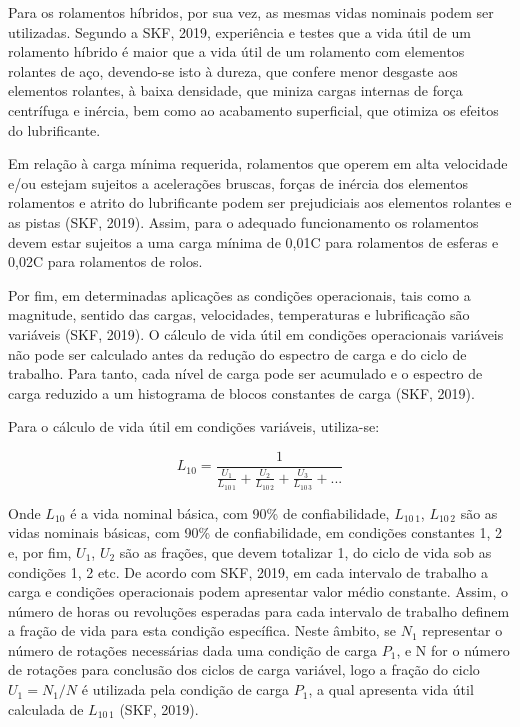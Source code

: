 \documentclass[
	12pt,				
	oneside,			
	a4paper,			
	english,			
	brazil,			
	]{abntex2ppgsi}
\begin{document}
Para os rolamentos híbridos, por sua vez, as mesmas vidas nominais podem ser utilizadas. Segundo a SKF, 2019, experiência e testes que a vida útil de um rolamento híbrido é maior que a vida útil de um rolamento com elementos rolantes de aço, devendo-se isto à dureza, que confere menor desgaste aos elementos rolantes, à baixa densidade, que miniza cargas internas de força centrífuga e inércia, bem como ao acabamento superficial, que otimiza os efeitos do lubrificante.

Em relação à carga mínima requerida, rolamentos que operem em alta velocidade e/ou estejam sujeitos a acelerações bruscas, forças de inércia dos elementos rolamentos e atrito do lubrificante podem ser prejudiciais aos elementos rolantes e as pistas (SKF, 2019). Assim, para o adequado funcionamento os rolamentos devem estar sujeitos a uma carga mínima de 0,01C para rolamentos de esferas e 0,02C para rolamentos de rolos. 

Por fim, em determinadas aplicações as condições operacionais, tais como a magnitude, sentido das cargas, velocidades, temperaturas e lubrificação são variáveis (SKF, 2019). O cálculo de vida útil em condições operacionais variáveis não pode ser calculado antes da redução do espectro de carga e do ciclo de trabalho. Para tanto, cada nível de carga pode ser acumulado e o espectro de carga reduzido a um histograma de blocos constantes de carga (SKF, 2019).

Para o cálculo de vida útil em condições variáveis, utiliza-se:

\begin{equation}
	L_{10}= \frac{1}{ \frac{U_{1}}{L_{10 \,1}} + \frac{U_{2}}{L_{10 \,2}} + \frac{U_{3}}{L_{10 \,3}} + ...}
	\label{eq:Calculo da vida Util em condições variaveis}
\end{equation}


Onde $L_{10}$ é a vida nominal básica, com 90\% de confiabilidade, $L_{10 \,1}$, $L_{10 \,2}$ são as vidas nominais básicas, com 90\% de confiabilidade, em condições constantes 1, 2 e, por fim, $U_{1}$, $U_{2}$ são as frações, que devem totalizar 1, do ciclo de vida sob as condições 1, 2 etc. De acordo com SKF, 2019, em cada intervalo de trabalho a carga e condições operacionais podem apresentar valor médio constante. Assim, o número de horas ou revoluções esperadas para cada intervalo de trabalho definem a fração de vida para esta condição específica. Neste âmbito, se ${N_{1}}$ representar o número de rotações necessárias dada uma condição de carga ${P_{1}}$, e N for o número de rotações para conclusão dos ciclos de carga variável, logo a fração do ciclo ${U_{1} = N_{1} / N}$ é utilizada pela condição de carga ${P_{1}}$, a qual apresenta vida útil calculada de ${L_{10 \,1}}$ (SKF, 2019).
\end{document}
